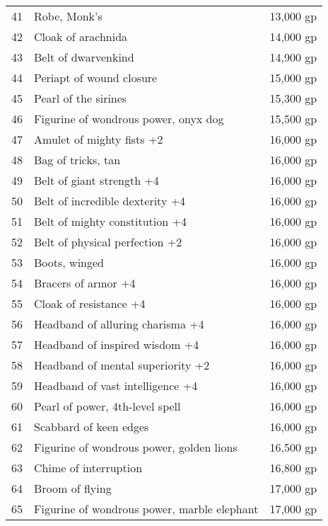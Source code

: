 \begin{table}[]
\begin{tabular}{lll}
41  & Robe, Monk's                                & 13,000 gp    \\
42  & Cloak of arachnida                          & 14,000 gp    \\
43  & Belt of dwarvenkind                         & 14,900 gp    \\
44  & Periapt of wound closure                    & 15,000 gp    \\
45  & Pearl of the sirines                        & 15,300 gp    \\
46  & Figurine of wondrous power, onyx dog        & 15,500 gp    \\
47  & Amulet of mighty fists +2                   & 16,000 gp    \\
48  & Bag of tricks, tan                          & 16,000 gp    \\
49  & Belt of giant strength +4                   & 16,000 gp    \\
50  & Belt of incredible dexterity +4             & 16,000 gp    \\
51  & Belt of mighty constitution +4              & 16,000 gp    \\
52  & Belt of physical perfection +2              & 16,000 gp    \\
53  & Boots, winged                               & 16,000 gp    \\
54  & Bracers of armor +4                         & 16,000 gp    \\
55  & Cloak of resistance +4                      & 16,000 gp    \\
56  & Headband of alluring charisma +4            & 16,000 gp    \\
57  & Headband of inspired wisdom +4              & 16,000 gp    \\
58  & Headband of mental superiority +2           & 16,000 gp    \\
59  & Headband of vast intelligence +4            & 16,000 gp    \\
60  & Pearl of power, 4th-level spell             & 16,000 gp    \\
61  & Scabbard of keen edges                      & 16,000 gp    \\
62  & Figurine of wondrous power, golden lions    & 16,500 gp    \\
63  & Chime of interruption                       & 16,800 gp    \\
64  & Broom of flying                             & 17,000 gp    \\
65  & Figurine of wondrous power, marble elephant & 17,000 gp    \\

\end{tabular}
\end{table}
